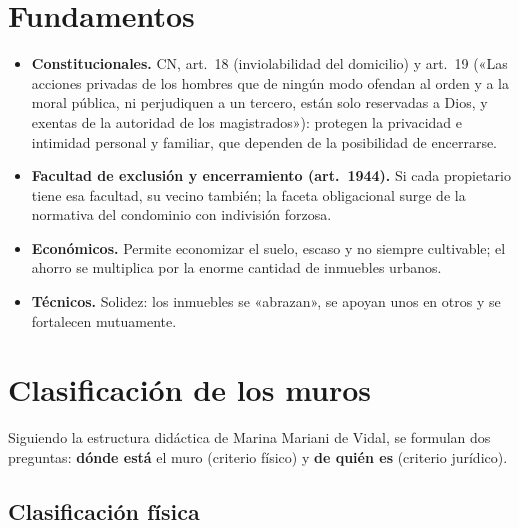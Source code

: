 \documentclass[12pt,oneside]{book}
\begin{document}
\section{Fundamentos}

\begin{itemize}
    \item \textbf{Constitucionales.} CN, art.~18 (inviolabilidad del domicilio) y art.~19 («Las acciones privadas de los hombres que de ningún modo ofendan al orden y a la moral pública, ni perjudiquen a un tercero, están solo reservadas a Dios, y exentas de la autoridad de los magistrados»): protegen la privacidad e intimidad personal y familiar, que dependen de la posibilidad de encerrarse.
    \item \textbf{Facultad de exclusión y encerramiento (art.~1944).} Si cada propietario tiene esa facultad, su vecino también; la faceta obligacional surge de la normativa del condominio con indivisión forzosa.
    \item \textbf{Económicos.} Permite economizar el suelo, escaso y no siempre cultivable; el ahorro se multiplica por la enorme cantidad de inmuebles urbanos.
    \item \textbf{Técnicos.} Solidez: los inmuebles se «abrazan», se apoyan unos en otros y se fortalecen mutuamente.
\end{itemize}

\section{Clasificación de los muros}

Siguiendo la estructura didáctica de Marina Mariani de Vidal, se formulan dos preguntas: \textbf{dónde está} el muro (criterio físico) y \textbf{de quién es} (criterio jurídico).

\subsection{Clasificación física}
\end{document}
